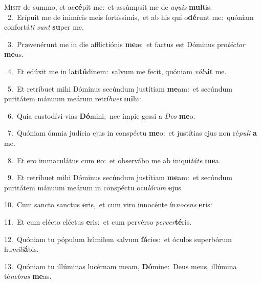 \lettrine{\initial\textcolor{\initialcolor}{M}}{isit} de summo, et ac\-\textbf{cé}\-pit me:~\star et assúmpsit me de \textit{a}\-\textit{quis} \textbf{mul}\-tis.\\
{\numbfont\textcolor{\numbcolor}{~2.}}~Erípuit me de inimícis meis fortíssimis,~\dagger et ab his qui o\-\textbf{dé}\-runt me:~\star quóniam confortá\textit{ti} \textit{sunt} \textbf{su}\-per me.\par
{\numbfont\textcolor{\numbcolor}{~3.}}~Prævenérunt me in die afflictiónis \textbf{me}\-æ:~\star et factus est Dóminus pro\-\textit{téc}\-\textit{tor} \textbf{me}\-us.\par
{\numbfont\textcolor{\numbcolor}{~4.}}~Et edúxit me in lati\-\textbf{tú}\-dinem:~\star salvum me fecit, quóniam \textit{vó}\-\textit{lu}\textbf{it} me.\par
{\numbfont\textcolor{\numbcolor}{~5.}}~Et retríbuet mihi Dóminus secúndum justítiam \textbf{me}\-am:~\star et secúndum puritátem mánuum meárum retrí\-\textit{bu}\-\textit{et} \textbf{mi}\-hi:\par
{\numbfont\textcolor{\numbcolor}{~6.}}~Quia custodívi vias \textbf{Dó}\-mini,~\star nec ímpie gessi a \textit{De}\-\textit{o} \textbf{me}\-o.\par
{\numbfont\textcolor{\numbcolor}{~7.}}~Quóniam ómnia judícia ejus in conspéctu \textbf{me}\-o:~\star et justítias ejus non ré\-\textit{pu}\-\textit{li} \textbf{a} me.\par
{\numbfont\textcolor{\numbcolor}{~8.}}~Et ero immaculátus cum \textbf{e}\-o:~\star et observábo me ab iniqui\-\textit{tá}\-\textit{te} \textbf{me}\-a.\par
{\numbfont\textcolor{\numbcolor}{~9.}}~Et retríbuet mihi Dóminus secúndum justítiam \textbf{me}\-am:~\star et secúndum puritátem mánuum meárum in conspéctu ocu\-\textit{ló}\-\textit{rum} \textbf{e}\-jus.\par
{\numbfont\textcolor{\numbcolor}{10.}}~Cum sancto sanctus \textbf{e}\-ris,~\star et cum viro innocénte ín\-\textit{no}\-\textit{cens} \textbf{e}\-ris:\par
{\numbfont\textcolor{\numbcolor}{11.}}~Et cum elécto eléctus \textbf{e}\-ris:~\star et cum pervérso \textit{per}\-\textit{ver}\textbf{té}ris.\par
{\numbfont\textcolor{\numbcolor}{12.}}~Quóniam tu pópulum húmilem salvum \textbf{fá}\-cies:~\star et óculos superbórum hu\-\textit{mi}\-\textit{li}\textbf{á}bis.\par
{\numbfont\textcolor{\numbcolor}{13.}}~Quóniam tu illúminas lucérnam meam, \textbf{Dó}\-mine:~\star Deus meus, illúmina té\-\textit{ne}\-\textit{bras} \textbf{me}\-as.\par
